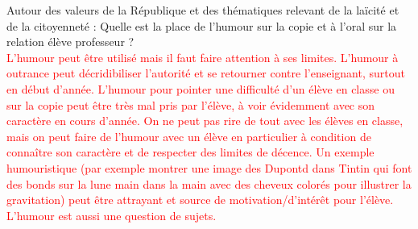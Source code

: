 \begin{reportBlock}{Autour des valeurs de la République et des thématiques relevant de la laïcité et de la citoyenneté :}
 Quelle est la place de l’humour sur la copie et à l’oral sur la relation élève professeur ?\\
 \textcolor{red}{L'humour peut être utilisé mais il faut faire attention à ses limites. L'humour à outrance peut décridibiliser l'autorité et se retourner contre l'enseignant, surtout en début d'année. L'humour pour pointer une difficulté d'un élève en classe ou sur la copie peut être très mal pris par l'élève, à voir évidemment avec son caractère en cours d'année. On ne peut pas rire de tout avec les élèves en classe, mais on peut faire de l'humour avec un élève en particulier à condition de connaître son caractère et de respecter des limites de décence. Un exemple humouristique (par exemple montrer une image des Dupontd dans Tintin qui font des bonds sur la lune main dans la main avec des cheveux colorés pour illustrer la gravitation) peut être attrayant et source de motivation/d'intérêt pour l'élève. L'humour est aussi une question de sujets. }
\end{reportBlock}
